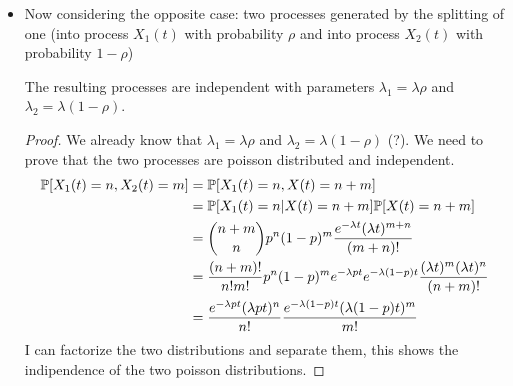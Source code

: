 \begin{itemize}
     \item Now considering the opposite case: two processes generated by the splitting of one (into process $X_1(t)$ with probability $\rho$ and into process $X_2(t)$ with probability $1-\rho$)
           \begin{figure}[H]
                  \centering
                  \end{figure}
            The resulting processes are independent with parameters $\lambda_1=\lambda \rho$ and $\lambda_2 = \lambda (1 - \rho)$.
            \begin{proof}
              We already know that $\lambda_1 = \lambda \rho$ and $\lambda_2 = \lambda (1 - \rho)$ (?).  We need to prove that the two processes are poisson distributed and independent.
              \begin{equation}
                \begin{split}
                  \mathbb{P}[X_1(t) = n, X_2(t)=m] &= \mathbb{P}[X_1(t)=n, X(t)= n +m] \\
                  &= \mathbb{P}[X_1(t)=n | X(t)=n+m]\mathbb{P}[X(t)=n+m]\\
                  &= {{n+m}\choose{n}}p^n(1-p)^m \frac{e^{-\lambda t}(\lambda t)^{m+n}}{(m+n)!}\\
                  &= \frac{(n+m)!}{n!m!}p^n(1-p)^m e^{-\lambda p t}e^{-\lambda (1-p)t}\frac{(\lambda t)^m (\lambda t)^n}{(n+m)!}\\
                  &= \frac{e^{-\lambda p t}(\lambda p t)^n}{n!}\frac{e^{-\lambda (1-p) t}(\lambda (1-p) t)^m}{m!}
                \end{split}
              \end{equation}
              I can factorize the two distributions and separate them, this shows the indipendence of the two poisson distributions.
            \end{proof}

\end{itemize}
